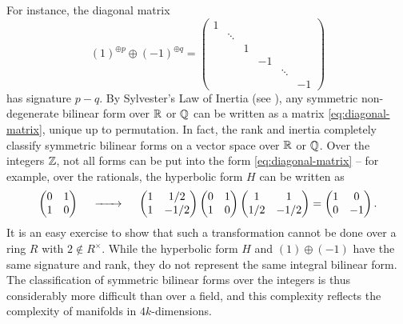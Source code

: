 For instance, the diagonal matrix
\begin{equation}\label{eq:diagonal-matrix}
	(1)^{\oplus p}\oplus (-1)^{\oplus q} = \begin{pmatrix}
		1 &        &   &    &             \\
		  & \ddots &   &    &             \\
		  &        & 1 &    &             \\
		  &        &   & -1 &        &    \\
		  &        &   &    & \ddots &    \\
		  &        &   &    &        & -1
	\end{pmatrix}
\end{equation}
has signature $p-q$. By Sylvester's Law of Inertia (see \cite{lam2005quadratic}), any symmetric non-degenerate bilinear form over $\mathbb{R}$ or $\mathbb{Q}$ can be written as a matrix \cref{eq:diagonal-matrix}, unique up to permutation.
In fact, the rank and inertia completely classify symmetric bilinear forms on a vector space over $\mathbb{R}$ or $\mathbb{Q}$. Over the integers $\mathbb{Z}$, not all forms can be put into the form \cref{eq:diagonal-matrix} -- for example, over the rationals, the hyperbolic form $H$ can be written as
\[
	\begin{pmatrix} 0 & 1\\ 1 & 0 \end{pmatrix}
	\quad\lkxto\quad
	\begin{pmatrix} 1 & 1/2 \\ 1 & -1/2 \end{pmatrix}
	\begin{pmatrix} 0 & 1 \\ 1 & 0 \end{pmatrix}
	\begin{pmatrix} 1 & 1 \\ 1/2 & -1/2 \end{pmatrix}=
	\begin{pmatrix} 1 & 0 \\ 0 & -1 \end{pmatrix}.
\]
It is an easy exercise to show that such a transformation cannot be done over a ring $R$ with $2\not\in R^\times$. While the hyperbolic form $H$ and $(1)\oplus (-1)$ have the same signature and rank, they do not represent the same integral bilinear form.
The classification of symmetric bilinear forms over the integers is thus considerably more difficult than over a field, and this complexity reflects the complexity of manifolds in $4k$-dimensions.

